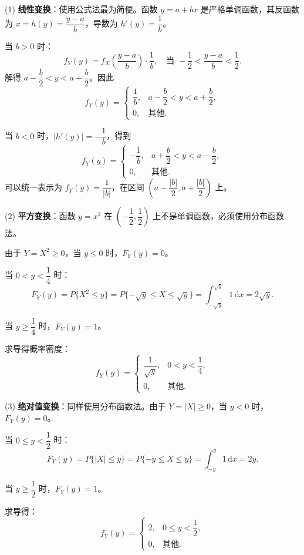 \documentclass[lang=cn,11pt]{elegantbook}
\begin{document}
\begin{solution}
(1) \textbf{线性变换}：使用公式法最为简便。函数 $y = a + bx$ 是严格单调函数，其反函数为 $x = h(y) = \dfrac{y-a}{b}$，导数为 $h'(y) = \dfrac{1}{b}$。

当 $b > 0$ 时：
\[
f_Y(y) = f_X\!\left(\frac{y-a}{b}\right) \cdot \frac{1}{b}, \quad \text{当 } -\frac{1}{2} < \frac{y-a}{b} < \frac{1}{2}.
\]
解得 $a - \dfrac{b}{2} < y < a + \dfrac{b}{2}$。因此
\[
f_Y(y) = \begin{cases}
\dfrac{1}{b}, & a - \dfrac{b}{2} < y < a + \dfrac{b}{2}, \\[6pt]
0, & \text{其他}.
\end{cases}
\]

当 $b < 0$ 时，$|h'(y)| = -\dfrac{1}{b}$，得到
\[
f_Y(y) = \begin{cases}
-\dfrac{1}{b}, & a + \dfrac{b}{2} < y < a - \dfrac{b}{2}, \\[6pt]
0, & \text{其他}.
\end{cases}
\]
可以统一表示为 $f_Y(y) = \dfrac{1}{|b|}$，在区间 $\left(a - \dfrac{|b|}{2}, a + \dfrac{|b|}{2}\right)$ 上。

(2) \textbf{平方变换}：函数 $y = x^2$ 在 $(-\dfrac{1}{2}, \dfrac{1}{2})$ 上不是单调函数，必须使用分布函数法。

由于 $Y = X^2 \ge 0$，当 $y \le 0$ 时，$F_Y(y) = 0$。

当 $0 < y < \dfrac{1}{4}$ 时：
\[
F_Y(y) = P\{X^2 \le y\} = P\{-\sqrt{y} \le X \le \sqrt{y}\} = \int_{-\sqrt{y}}^{\sqrt{y}} 1 \, \mathrm{d}x = 2\sqrt{y}.
\]

当 $y \ge \dfrac{1}{4}$ 时，$F_Y(y) = 1$。

求导得概率密度：
\[
f_Y(y) = \begin{cases}
\dfrac{1}{\sqrt{y}}, & 0 < y < \dfrac{1}{4}, \\[6pt]
0, & \text{其他}.
\end{cases}
\]

(3) \textbf{绝对值变换}：同样使用分布函数法。由于 $Y = |X| \ge 0$，当 $y < 0$ 时，$F_Y(y) = 0$。

当 $0 \le y < \dfrac{1}{2}$ 时：
\[
F_Y(y) = P\{|X| \le y\} = P\{-y \le X \le y\} = \int_{-y}^{y} 1 \, \mathrm{d}x = 2y.
\]

当 $y \ge \dfrac{1}{2}$ 时，$F_Y(y) = 1$。

求导得：
\[
f_Y(y) = \begin{cases}
2, & 0 \le y < \dfrac{1}{2}, \\[6pt]
0, & \text{其他}.
\end{cases}
\]
\end{solution}
\end{document}
